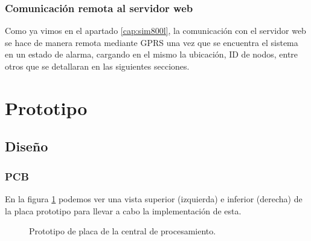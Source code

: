 \subsubsection{Comunicación remota al servidor web}
\par Como ya vimos en el apartado \ref{cap:sim800l}, la comunicación con el servidor web se hace de manera remota mediante GPRS una vez que se encuentra el sistema en un estado de alarma, cargando en el mismo la ubicación, ID de nodos, entre otros que se detallaran en las siguientes secciones. 

\section{Prototipo}
\subsection{Diseño}
\subsubsection{PCB}
\par En la figura \ref{im:pcb-prototipo} podemos ver una vista superior (izquierda) e inferior (derecha) de la placa prototipo para llevar a cabo la implementación de esta. 
\begin{figure}[h!]
\begin{center}
    \caption{Prototipo de placa de la central de procesamiento.}
	\label{im:pcb-prototipo}
\end{center}
\end{figure}

